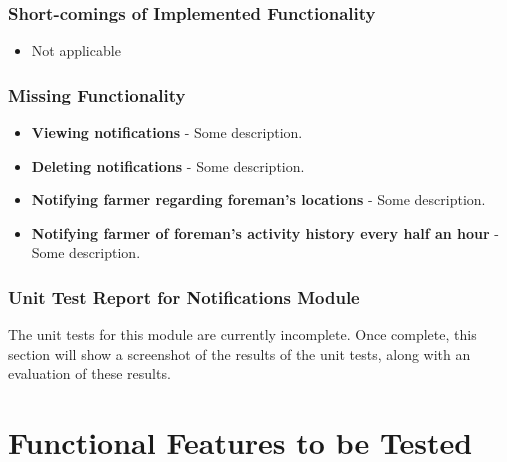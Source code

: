 \documentclass[11pt,fleqn]{book} %
\begin{document}
		\subsection{Short-comings of Implemented Functionality}
			\begin{itemize}
				\item{Not applicable}
			\end{itemize}
		\subsection{Missing Functionality}
			\begin{itemize}
				\item\textbf{Viewing notifications} -
				Some description.
				
				\item\textbf{Deleting notifications} -
				Some description.
				
				\item\textbf{Notifying farmer regarding foreman’s locations} -
				Some description.
				
				\item\textbf{Notifying farmer of foreman’s activity history every half an hour} -
				Some description.			
			\end{itemize}
		\subsection{Unit Test Report for Notifications Module}
			The unit tests for this module are currently incomplete. Once complete, this section will show a screenshot of the results of the unit tests, along with an evaluation of these results.


\chapter{Functional Features to be Tested}


\end{document}
